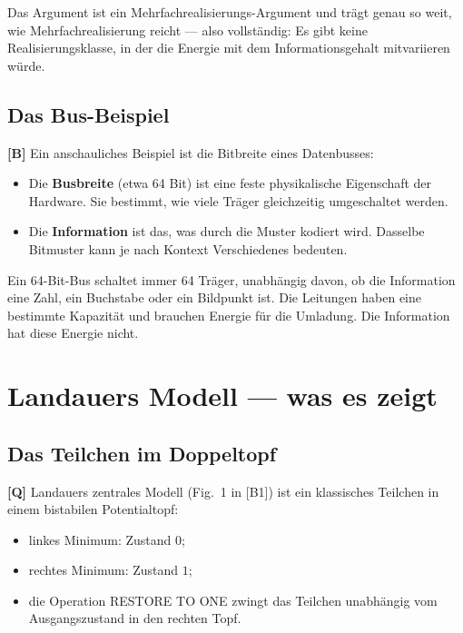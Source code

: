 Das Argument ist ein Mehrfachrealisierungs-Argument und trägt genau so weit, wie
Mehrfachrealisierung reicht --- also vollständig: Es gibt keine
Realisierungsklasse, in der die Energie mit dem Informationsgehalt mitvariieren
würde.

\subsection{Das Bus-Beispiel}

\textbf{[B]} Ein anschauliches Beispiel ist die Bitbreite eines Datenbusses:

\begin{itemize}[leftmargin=1.4em,itemsep=0.25em]
  \item Die \textbf{Busbreite} (etwa 64 Bit) ist eine feste physikalische
        Eigenschaft der Hardware. Sie bestimmt, wie viele Träger gleichzeitig
        umgeschaltet werden.
  \item Die \textbf{Information} ist das, was durch die Muster kodiert wird.
        Dasselbe Bitmuster kann je nach Kontext Verschiedenes bedeuten.
\end{itemize}

Ein 64-Bit-Bus schaltet immer 64 Träger, unabhängig davon, ob die Information eine
Zahl, ein Buchstabe oder ein Bildpunkt ist. Die Leitungen haben eine bestimmte
Kapazität und brauchen Energie für die Umladung. Die Information hat diese Energie
nicht.

\section{Landauers Modell --- was es zeigt}

\subsection{Das Teilchen im Doppeltopf}

\textbf{[Q]} Landauers zentrales Modell (Fig.~1 in [B1]) ist ein klassisches Teilchen in
einem bistabilen Potentialtopf:

\begin{itemize}[leftmargin=1.4em,itemsep=0.2em]
  \item linkes Minimum: Zustand $0$;
  \item rechtes Minimum: Zustand $1$;
  \item die Operation \textup{RESTORE TO ONE} zwingt das Teilchen unabhängig vom
        Ausgangszustand in den rechten Topf.
\end{itemize}

